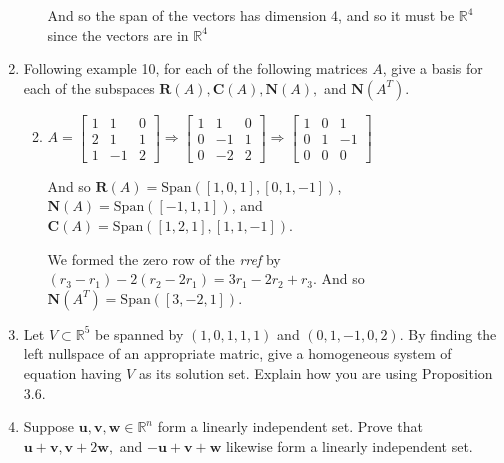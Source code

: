 \documentclass[letterpaper]{article}
\newcommand{\Span}{\text{Span}}
\begin{document}
\begin{enumerate}
\begin{enumerate}
  And so the span of the vectors has dimension 4, and so it must be $\mathbb{R}^4$ since the vectors are in $\mathbb{R}^4$
  \end{enumerate}
\setcounter{enumi}{4}
\item
Following example 10, for each of the following matrices $A$, give a basis for each of the subspaces $\mathbf{R}(A),\mathbf{C}(A),\mathbf{N}(A),$ and $\mathbf{N}(A^T)$.
  \begin{enumerate}
  \setcounter{enumii}{1}
  \item
  $A=
  \left[\begin{array}{rrr}
  1&1&0\\
  2&1&1\\
  1&-1&2
  \end{array}\right]
  \Rightarrow
  \left[\begin{array}{rrr}
  1&1&0\\
  0&-1&1\\
  0&-2&2
  \end{array}\right]
  \Rightarrow
  \left[\begin{array}{rrr}
  1&0&1\\
  0&1&-1\\
  0&0&0
  \end{array}\right]
  $

  And so
  $\mathbf{R}(A)=\Span\left([1,0,1],[0,1,-1]\right)$,
  $\mathbf{N}(A)=\Span\left([-1,1,1]\right)$,
  and $\mathbf{C}(A)=\Span\left([1,2,1],[1,1,-1]\right)$.

  We formed the zero row of the \emph{rref} by $(r_3-r_1)-2(r_2-2r_1)=3r_1-2r_2+r_3$. And so $\mathbf{N}(A^T)=\Span\left([3,-2,1]\right)$.
  \end{enumerate}
\setcounter{enumi}{6}
\item
Let $V\subset \mathbb{R}^5$ be spanned by $(1,0,1,1,1)$ and $(0,1,-1,0,2)$. By finding the left nullspace of an appropriate matric, give a homogeneous system of equation having $V$ as its solution set. Explain how you are using Proposition 3.6.
\setcounter{enumi}{8}
\item
Suppose $\mathbf{u},\mathbf{v},\mathbf{w}\in \mathbb{R}^n$ form a linearly independent set. Prove that $\mathbf{u}+\mathbf{v}, \mathbf{v}+2\mathbf{w},$ and $-\mathbf{u}+\mathbf{v}+\mathbf{w}$ likewise form a linearly  independent set. 


\end{enumerate}
\end{document}
